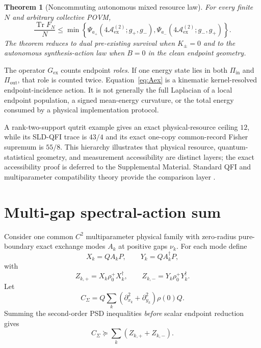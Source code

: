 \documentclass[aps,pra,preprint,nofootinbib]{revtex4-2}
\newtheorem{theorem}{Theorem}
\newcommand{\Tr}{\operatorname{Tr}}
\newcommand{\rhozero}{\rho_0}
\newcommand{\Fcl}{F}
\newcommand{\Aact}{\mathcal A}
\begin{document}
\begin{theorem}[Noncommuting autonomous mixed resource law]
\label{thm:mixed}
For every finite $N$ and arbitrary collective POVM,
\begin{equation}
\boxed{
\frac{\Tr \Fcl_N}{N}
\le
\min\!\left\{
\Psi_{a_+}(4\Aact_{\mathrm{ex}}^{(2)};g_+,g_-),
\Psi_{a_-}(4\Aact_{\mathrm{ex}}^{(2)};g_-,g_+)
\right\}.
}
\label{eq:mixed-master}
\end{equation}
The theorem reduces to dual pre-existing survival when $K_\pm=0$ and to the autonomous synthesis-action law when $B=0$ in the clean endpoint geometry.
\end{theorem}

The operator $G_{\mathrm{ex}}$ counts endpoint \emph{roles}.  If one energy state lies in both $\Pi_{\mathrm{in}}$ and $\Pi_{\mathrm{out}}$, that role is counted twice.  Equation~\eqref{eq:Aex} is a kinematic kernel-resolved endpoint-incidence action.  It is not generally the full Laplacian of a local endpoint population, a signed mean-energy curvature, or the total energy consumed by a physical implementation protocol.

A rank-two-support qutrit example gives an exact physical-resource ceiling $12$, while its SLD-QFI trace is $43/4$ and its exact one-copy common-record Fisher supremum is $55/8$.  This hierarchy illustrates that physical resource, quantum-statistical geometry, and measurement accessibility are distinct layers; the exact accessibility proof is deferred to the Supplemental Material.  Standard QFI and multiparameter compatibility theory provide the comparison layer \cite{BraunsteinCaves1994,GillMassar2000,LiEtAl2016,GardnerEtAl2024}.

\section{Multi-gap spectral-action sum}
\label{sec:multigap}


Consider one common $C^2$ multiparameter physical family with zero-radius pure-boundary exact exchange modes $A_k$ at positive gaps $\nu_k$.  For each mode define
\begin{equation}
X_k=QA_kP,
\qquad
Y_k=QA_k^\dagger P,
\end{equation}
with
\begin{equation}
Z_{k,+}=X_k\rhozero^+X_k^\dagger,
\qquad
Z_{k,-}=Y_k\rhozero^+Y_k^\dagger.
\end{equation}
Let
\begin{equation}
C_\Sigma=
Q\sum_k(\partial_{x_k}^2+\partial_{y_k}^2)\rho(0)Q.
\label{eq:Csigma}
\end{equation}
Summing the second-order PSD inequalities \emph{before} scalar endpoint reduction gives
\begin{equation}
\boxed{
C_\Sigma\succeq\sum_k(Z_{k,+}+Z_{k,-}).
}
\label{eq:Csigma-bound}
\end{equation}
\end{document}
